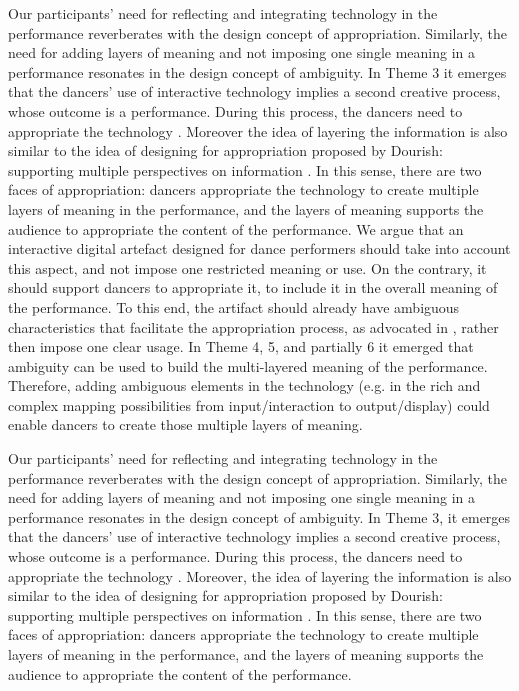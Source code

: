 Our participants' need for reflecting and integrating technology in the performance reverberates with the design concept of appropriation. Similarly, the need for adding layers of meaning and not imposing one single meaning in a performance resonates in the design concept of ambiguity. 
In Theme 3 it emerges that the dancers' use of interactive technology implies a second creative process, whose outcome is a performance. During this process, the dancers need to appropriate the technology \cite{dix2007designing}. Moreover the idea of layering the information is also similar to the idea of designing for appropriation proposed by Dourish: supporting multiple perspectives on information \cite{dourish2003appropriation}. 
In this sense, there are two faces of appropriation: dancers { appropriate} the technology to create multiple layers of meaning in the performance, and the layers of meaning supports the audience to { appropriate} the content of the performance. 
We argue that an interactive digital  artefact designed for dance performers should take into account this aspect, and not impose one restricted meaning or use. On the contrary, it should support dancers to appropriate it, to include it in the overall meaning of the performance. To this end, the artifact should already have ambiguous characteristics that facilitate the appropriation process, as advocated in \cite{gaver2003ambiguity}, rather then impose one clear usage. In Theme 4, 5, and partially 6 it emerged that ambiguity can be used to build the multi-layered meaning of the performance. Therefore, adding ambiguous elements in the technology (e.g. in the rich and complex mapping possibilities  from input/interaction to output/display) could enable dancers to create those multiple layers of meaning. %

Our participants’ need for reflecting and integrating technology in the performance reverberates with the design concept of appropriation. Similarly, the need for adding layers of meaning and not imposing one single meaning in a performance resonates in the design concept of ambiguity. In Theme 3, it emerges that the dancers’ use of interactive technology implies a second creative process, whose outcome is a performance. During this process, the dancers need to appropriate the technology \cite{dix2007designing}. Moreover, the idea of layering the information is also similar to the idea of designing for appropriation proposed by Dourish: supporting multiple perspectives on information \cite{dourish2003appropriation}. In this sense, there are two faces of appropriation: dancers appropriate the technology to create multiple layers of meaning in the performance, and the layers of meaning supports the audience to appropriate the content of the performance.

